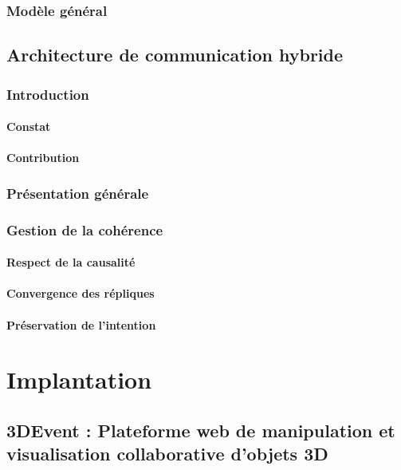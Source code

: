 \documentclass[final,10pt,doubleside]{book}
\begin{document}
	\subsection{Modèle général}
	
	

\section{Architecture de communication hybride}

	\subsection{Introduction}
		\subsubsection{Constat}
		\subsubsection{Contribution}
		
	\subsection{Présentation générale}
	
	\subsection{Gestion de la cohérence}
		\subsubsection{Respect de la causalité}
		\subsubsection{Convergence des répliques}
		\subsubsection{Préservation de l'intention}

\chapter{Implantation}

\section{3DEvent : Plateforme web de manipulation et visualisation 
collaborative 
d'objets 3D}
\end{document}
